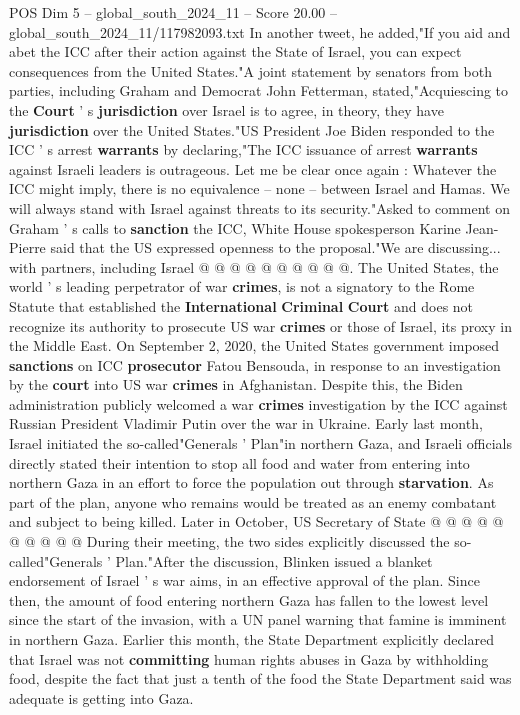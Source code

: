 \begin{textsample}{POS Dim 5 – global\_south\_2024\_11 – Score 20.00 – global\_south\_2024\_11/117982093.txt}
In another tweet, he added,"If you aid and abet the ICC after their action against the State of Israel, you can expect consequences from the United States."A joint statement by senators from both parties, including Graham and Democrat John Fetterman, stated,"Acquiescing to the \textbf{Court} ' s \textbf{jurisdiction} over Israel is to agree, in theory, they have \textbf{jurisdiction} over the United States."US President Joe Biden responded to the ICC ' s arrest \textbf{warrants} by declaring,"The ICC issuance of arrest \textbf{warrants} against Israeli leaders is outrageous.
Let me be clear once again : Whatever the ICC might imply, there is no equivalence -- none -- between Israel and Hamas.
We will always stand with Israel against threats to its security."Asked to comment on Graham ' s calls to \textbf{sanction} the ICC, White House spokesperson Karine Jean-Pierre said that the US expressed openness to the proposal."We are discussing... with partners, including Israel @ @ @ @ @ @ @ @ @ @.
The United States, the world ' s leading perpetrator of war \textbf{crimes}, is not a signatory to the Rome Statute that established the \textbf{International} \textbf{Criminal} \textbf{Court} and does not recognize its authority to prosecute US war \textbf{crimes} or those of Israel, its proxy in the Middle East.
On September 2, 2020, the United States government imposed \textbf{sanctions} on ICC \textbf{prosecutor} Fatou Bensouda, in response to an investigation by the \textbf{court} into US war \textbf{crimes} in Afghanistan.
Despite this, the Biden administration publicly welcomed a war \textbf{crimes} investigation by the ICC against Russian President Vladimir Putin over the war in Ukraine.
Early last month, Israel initiated the so-called"Generals ' Plan"in northern Gaza, and Israeli officials directly stated their intention to stop all food and water from entering into northern Gaza in an effort to force the population out through \textbf{starvation}.
As part of the plan, anyone who remains would be treated as an enemy combatant and subject to being killed.
Later in October, US Secretary of State @ @ @ @ @ @ @ @ @ @ During their meeting, the two sides explicitly discussed the so-called"Generals ' Plan."After the discussion, Blinken issued a blanket endorsement of Israel ' s war aims, in an effective approval of the plan.
Since then, the amount of food entering northern Gaza has fallen to the lowest level since the start of the invasion, with a UN panel warning that famine is imminent in northern Gaza.
Earlier this month, the State Department explicitly declared that Israel was not \textbf{committing} human rights abuses in Gaza by withholding food, despite the fact that just a tenth of the food the State Department said was adequate is getting into Gaza.

\end{textsample}
